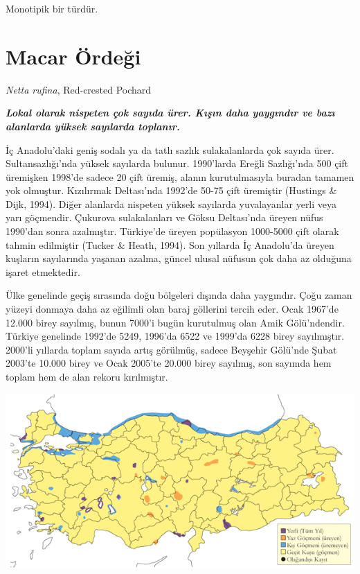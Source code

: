\documentclass[
  a4paper,
  DIV=11,
  numbers=noendperiod]{scrreprt}
\begin{document}
Monotipik bir türdür.

\section{Macar Ördeği}\label{macar-uxf6rdeux11fi}

\emph{Netta rufina}, Red-crested Pochard

\textbf{\emph{Lokal olarak nispeten çok sayıda ürer. Kışın daha
yaygındır ve bazı alanlarda yüksek sayılarda toplanır.}}

İç Anadolu'daki geniş sodalı ya da tatlı sazlık sulakalanlarda çok
sayıda ürer. Sultansazlığı'nda yüksek sayılarda bulunur. 1990'larda
Ereğli Sazlığı'nda 500 çift üremişken 1998'de sadece 20 çift üremiş,
alanın kurutulmasıyla buradan tamamen yok olmuştur. Kızılırmak
Deltası'nda 1992'de 50-75 çift üremiştir (Hustings \& Dijk, 1994). Diğer
alanlarda nispeten yüksek sayılarda yuvalayanlar yerli veya yarı
göçmendir. Çukurova sulakalanları ve Göksu Deltası'nda üreyen nüfus
1990'dan sonra azalmıştır. Türkiye'de üreyen popülasyon 1000-5000 çift
olarak tahmin edilmiştir (Tucker \& Heath, 1994). Son yıllarda İç
Anadolu'da üreyen kuşların sayılarında yaşanan azalma, güncel ulusal
nüfusun çok daha az olduğuna işaret etmektedir.

Ülke genelinde geçiş sırasında doğu bölgeleri dışında daha yaygındır.
Çoğu zaman yüzeyi donmaya daha az eğilimli olan baraj göllerini tercih
eder. Ocak 1967'de 12.000 birey sayılmış, bunun 7000'i bugün kurutulmuş
olan Amik Gölü'ndendir. Türkiye genelinde 1992'de 5249, 1996'da 6522 ve
1999'da 6228 birey sayılmıştır. 2000'li yıllarda toplam sayıda artış
görülmüş, sadece Beyşehir Gölü'nde Şubat 2003'te 10.000 birey ve Ocak
2005'te 20.000 birey sayılmış, son sayımda hem toplam hem de alan rekoru
kırılmıştır.

\includegraphics{images/harita_Page_022.png}
\end{document}
